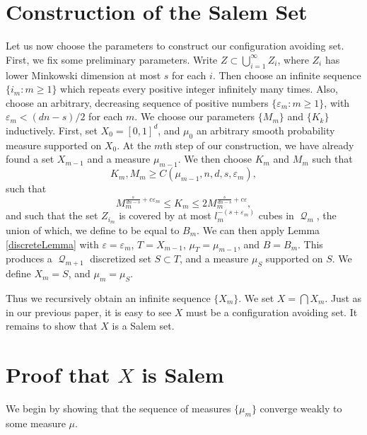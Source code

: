 \documentclass[12pt,reqno]{article}
\numberwithin{equation}{section}
\DeclareMathOperator{\DQ}{\mathcal{Q}}
\begin{document}
\section{Construction of the Salem Set}

Let us now choose the parameters to construct our configuration avoiding set. First, we fix some preliminary parameters. Write $Z \subset \bigcup_{i = 1}^\infty Z_i$, where $Z_i$ has lower Minkowski dimension at most $s$ for each $i$. Then choose an infinite sequence $\{ i_m : m \geq 1 \}$ which repeats every positive integer infinitely many times. Also, choose an arbitrary, decreasing sequence of positive numbers $\{ \varepsilon_m : m \geq 1 \}$, with $\varepsilon_m < (dn - s)/2$ for each $m$. We choose our parameters $\{ M_m \}$ and $\{ K_k \}$ inductively. First, set $X_0 = [0,1]^d$, and $\mu_0$ an arbitrary smooth probability measure supported on $X_0$. At the $m$th step of our construction, we have already found a set $X_{m-1}$ and a measure $\mu_{m-1}$. We then choose $K_m$ and $M_m$ such that
%
\[ K_m, M_m \geq C(\mu_{m-1}, n, d, s, \varepsilon_m), \]
%
such that
%
\[ M_m^{\frac{s}{dn-s} + c\varepsilon_m} \leq K_m \leq 2 M_m^{\frac{s}{dn-s} + c\varepsilon}, \]
%
and such that the set $Z_{i_m}$ is covered by at most $l_m^{-(s + \varepsilon_m)}$ cubes in $\DQ_m$, the union of which, we define to be equal to $B_m$. We can then apply Lemma \ref{discreteLemma} with $\varepsilon = \varepsilon_m$, $T = X_{m-1}$, $\mu_T = \mu_{m-1}$, and $B = B_m$. This produces a $\DQ_{m+1}$ discretized set $S \subset T$, and a measure $\mu_S$ supported on $S$. We define $X_m = S$, and $\mu_m = \mu_S$.

Thus we recursively obtain an infinite sequence $\{ X_m \}$. We set $X = \bigcap X_m$. Just as in our previous paper, it is easy to see $X$ must be a configuration avoiding set. It remains to show that $X$ is a Salem set.

\section{Proof that $X$ is Salem}

We begin by showing that the sequence of measures $\{ \mu_m \}$ converge weakly to some measure $\mu$.
\end{document}
